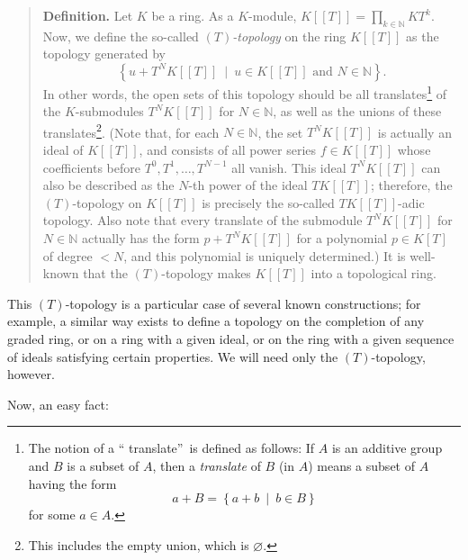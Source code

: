 \documentclass[numbers=enddot,12pt,final,onecolumn,notitlepage]{scrartcl}%
\begin{document}
\begin{quote}
\textbf{Definition.} Let $K$ be a ring. As a $K$-module, $K\left[  \left[
T\right]  \right]  =\prod\limits_{k\in\mathbb{N}}KT^{k}$. Now, we define the
so-called $\left(  T\right)  $\textit{-topology} on the ring $K\left[  \left[
T\right]  \right]  $ as the topology generated by%
\[
\left\{  u+T^{N}K\left[  \left[  T\right]  \right]  \ \mid\ u\in K\left[
\left[  T\right]  \right]  \text{ and }N\in\mathbb{N}\right\}  .
\]
In other words, the open sets of this topology should be all
translates\footnote{The notion of a \textquotedblleft
translate\textquotedblright\ is defined as follows: If $A$ is an additive
group and $B$ is a subset of $A$, then a \textit{translate} of $B$ (in $A$)
means a subset of $A$ having the form%
\[
a+B=\left\{  a+b\ \mid\ b\in B\right\}
\]
for some $a\in A$.} of the $K$-submodules $T^{N}K\left[  \left[  T\right]
\right]  $ for $N\in\mathbb{N}$, as well as the unions of these
translates\footnote{This includes the empty union, which is $\varnothing$.}.
(Note that, for each $N\in\mathbb{N}$, the set $T^{N}K\left[  \left[
T\right]  \right]  $ is actually an ideal of $K\left[  \left[  T\right]
\right]  $, and consists of all power series $f\in K\left[  \left[  T\right]
\right]  $ whose coefficients before $T^{0},T^{1},\ldots,T^{N-1}$ all vanish.
This ideal $T^{N}K\left[  \left[  T\right]  \right]  $ can also be described
as the $N$-th power of the ideal $TK\left[  \left[  T\right]  \right]  $;
therefore, the $\left(  T\right)  $-topology on $K\left[  \left[  T\right]
\right]  $ is precisely the so-called $TK\left[  \left[  T\right]  \right]
$-adic topology. Also note that every translate of the submodule
$T^{N}K\left[  \left[  T\right]  \right]  $ for $N\in\mathbb{N}$ actually has
the form $p+T^{N}K\left[  \left[  T\right]  \right]  $ for a polynomial $p\in
K\left[  T\right]  $ of degree $<N$, and this polynomial is uniquely
determined.) It is well-known that the $\left(  T\right)  $-topology makes
$K\left[  \left[  T\right]  \right]  $ into a topological ring.
\end{quote}

This $\left(  T\right)  $-topology is a particular case of several known
constructions; for example, a similar way exists to define a topology on the
completion of any graded ring, or on a ring with a given ideal, or on the ring
with a given sequence of ideals satisfying certain properties. We will need
only the $\left(  T\right)  $-topology, however.

Now, an easy fact:
\end{document}

